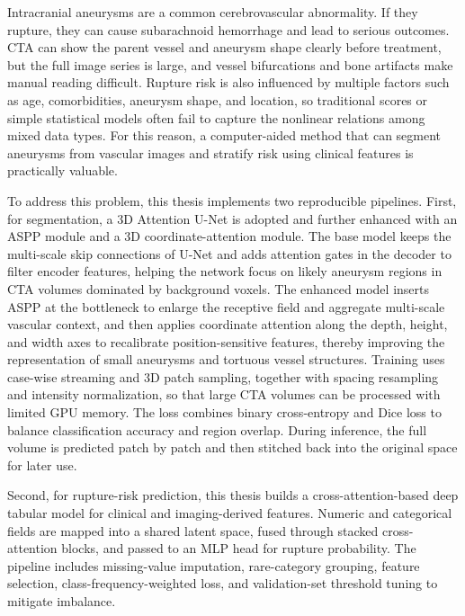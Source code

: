 Intracranial aneurysms are a common cerebrovascular abnormality. If they rupture, they can cause subarachnoid hemorrhage and lead to serious outcomes. CTA can show the parent vessel and aneurysm shape clearly before treatment, but the full image series is large, and vessel bifurcations and bone artifacts make manual reading difficult. Rupture risk is also influenced by multiple factors such as age, comorbidities, aneurysm shape, and location, so traditional scores or simple statistical models often fail to capture the nonlinear relations among mixed data types. For this reason, a computer-aided method that can segment aneurysms from vascular images and stratify risk using clinical features is practically valuable.\par

To address this problem, this thesis implements two reproducible pipelines. First, for segmentation, a 3D Attention U-Net is adopted and further enhanced with an ASPP module and a 3D coordinate-attention module. The base model keeps the multi-scale skip connections of U-Net and adds attention gates in the decoder to filter encoder features, helping the network focus on likely aneurysm regions in CTA volumes dominated by background voxels. The enhanced model inserts ASPP at the bottleneck to enlarge the receptive field and aggregate multi-scale vascular context, and then applies coordinate attention along the depth, height, and width axes to recalibrate position-sensitive features, thereby improving the representation of small aneurysms and tortuous vessel structures. Training uses case-wise streaming and 3D patch sampling, together with spacing resampling and intensity normalization, so that large CTA volumes can be processed with limited GPU memory. The loss combines binary cross-entropy and Dice loss to balance classification accuracy and region overlap. During inference, the full volume is predicted patch by patch and then stitched back into the original space for later use.\par

Second, for rupture-risk prediction, this thesis builds a cross-attention-based deep tabular model for clinical and imaging-derived features. Numeric and categorical fields are mapped into a shared latent space, fused through stacked cross-attention blocks, and passed to an MLP head for rupture probability. The pipeline includes missing-value imputation, rare-category grouping, feature selection, class-frequency-weighted loss, and validation-set threshold tuning to mitigate imbalance.\par

